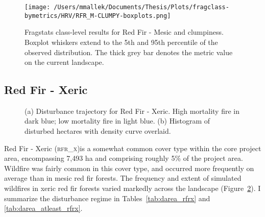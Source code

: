 \begin{figure}[!htbp]
\centering
    \texttt{[image: /Users/mmallek/Documents/Thesis/Plots/fragclass-bymetrics/HRV/RFR\_M-CLUMPY-boxplots.png]}
  \caption{Fragstats class-level results for Red Fir - Mesic and clumpiness. Boxplot whiskers extend to the 5th and 95th percentile of the observed distribution. The thick grey bar denotes the metric value on the current landscape.}
  \label{fig:rfrm_clumpy}
\end{figure}


\clearpage
\subsection{Red Fir - Xeric} 

\begin{figure}[!htbp]
  \centering
  \caption{\small (a) Disturbance trajectory for Red Fir - Xeric. High mortality fire in dark blue; low mortality fire in light blue. (b) Histogram of disturbed hectares with density curve overlaid.} 
  \label{fig:darea_rfrx}
\end{figure}

Red Fir - Xeric (\textsc{rfr\_x})is a somewhat common cover type within the core project area, encompassing 7,493 ha and comprising roughly 5\% of the project area. Wildfire was fairly common in this cover type, and occurred more frequently on average than in mesic red fir forests.
The frequency and extent of simulated wildfires in xeric red fir forests varied markedly across the landscape (Figure~\ref{fig:darea_rfrx}). I summarize the disturbance regime in Tables~\ref{tab:darea_rfrx} and \ref{tab:darea_atleast_rfrx}.

